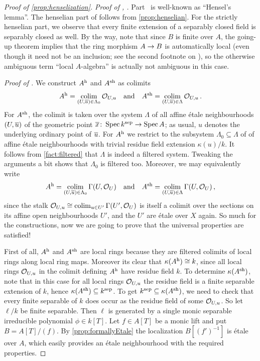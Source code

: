 \begin{proof}[Proof of \cref{prop:henselization}]
	\emph{Proof of , .} Part~ is well-known as \enquote{Hensel's lemma}. The henselian part of  follows from \cref{prop:henselian}. For the strictly henselian part, we observe that every finite extension of a separably closed field is separably closed as well. By the way, note that since $B$ is finite over $A$, the going-up theorem implies that the ring morphism $A\morphism B$ is automatically local (even though it need not be an inclusion; see the second footnote on ), so the otherwise ambiguous term \enquote{local $A$-algebra} is actually not ambiguous in this case. 
	
	\emph{Proof of .} We construct $A^{\mathrm{h}}$ and $A^{\mathrm{sh}}$ as colimits
	\begin{equation}\label{eq:AhColim1}
		A^\h=\colimit_{(U,\ov{u})\in \Lambda_0}\Oo_{U,u}\quad\text{and}\quad A^\sh=\colimit_{(U,\ov{u})\in\Lambda} \Oo_{U,u}\,.
	\end{equation}
	For $A^{\mathrm{sh}}$, the colimit is taken over the system $\Lambda$ of all affine étale neighbourhoods $(U,\ov{u})$ of the geometric point $\ov{x}\colon \Spec k^\sep\morphism \Spec A$; as usual, $u$ denotes the underlying ordinary point of $\ov{u}$. For $A^{\mathrm{h}}$ we restrict to the subsystem $\Lambda_0\subseteq \Lambda$ of of affine étale neighbourhoods with trivial residue field extension $\kappa(u)/k$. It follows from \cref{fact:filtered} that $\Lambda$ is indeed a filtered system. Tweaking the arguments a bit shows that $\Lambda_0$ is filtered too. Moreover, we may equivalently write 
	\begin{equation}\label{eq:AhColim2}
		A^\h=\colimit_{(U,\ov{u})\in\Lambda_0}\Global(U,\Oo_U)\quad\text{and}\quad A^\sh=\colimit_{(U,\ov{u})\in\Lambda}\Global(U,\Oo_U)\,,
	\end{equation}
	since the stalk $\mathcal{O}_{U,u}\cong \operatorname*{colim}_{u\in U'}\operatorname{\Gamma}(U',\mathcal{O}_U)$ is itself a colimit over the sections on its affine open neighbourhoods $U'$, and the $U'$ are étale over $X$ again. So much for the constructions, now we are going to prove that the universal properties are satisfied!
	
	First of all, $A^{\mathrm{h}}$ and $A^{\mathrm{sh}}$ are local rings because they are filtered colimits of local rings along local ring maps. Moreover its clear that $\kappa(A^{\mathrm{h}})\cong k$, since all local rings $\mathcal{O}_{U,u}$ in the colimit defining $A^{\mathrm{h}}$ have residue field $k$. To determine $\kappa(A^{\mathrm{sh}})$, note that in this case for all local rings $\mathcal{O}_{U,u}$ the residue field is a finite separable extension of $k$, hence $\kappa(A^{\mathrm{sh}})\subseteq k^{\mathrm{sep}}$. To get $k^{\mathrm{sep}}\subseteq \kappa(A^{\mathrm{sh}})$, we need to check that every finite separable of $k$ does occur as the residue field of some $\mathcal{O}_{U,u}$. So let $\ell/k$ be finite separable. Then $\ell$ is generated by a single monic separable irreducible polynomial $\phi\in k[T]$. Let $f\in A[T]$ be a monic lift and put $B=A[T]/(f)$. By \cref{prop:formallyEtale} the localization $B[(f')^{-1}]$ is étale over $A$, which easily provides an étale neighbourhood with the required properties.
	

\end{proof}
